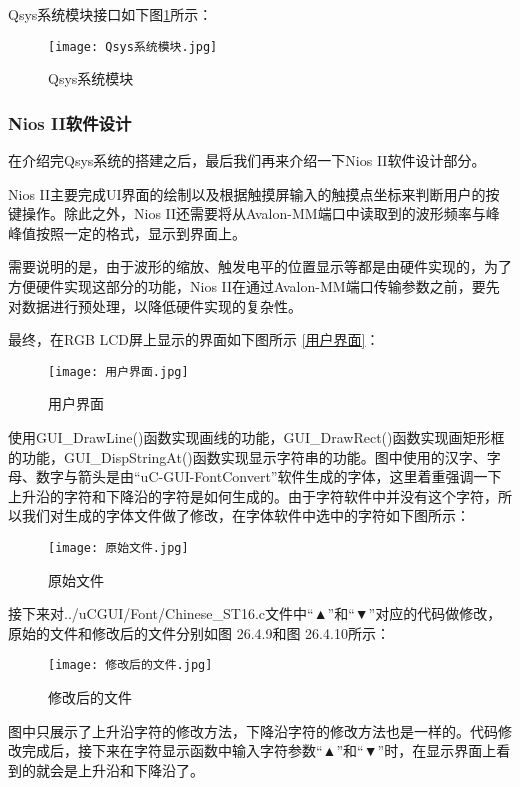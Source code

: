 \documentclass[lang=cn,a4paper,newtx]{elegantpaper}
\begin{document}
Qsys系统模块接口如下图\ref{Qsys系统模块}所示：
  \begin{figure}[!htb]
	\centering
	\caption{Qsys系统模块}
	\label{Qsys系统模块}
	\texttt{[image: Qsys系统模块.jpg]}
\end{figure}

\subsubsection{Nios II软件设计}
在介绍完Qsys系统的搭建之后，最后我们再来介绍一下Nios II软件设计部分。

Nios II主要完成UI界面的绘制以及根据触摸屏输入的触摸点坐标来判断用户的按键操作。除此之外，Nios II还需要将从Avalon-MM端口中读取到的波形频率与峰峰值按照一定的格式，显示到界面上。

需要说明的是，由于波形的缩放、触发电平的位置显示等都是由硬件实现的，为了方便硬件实现这部分的功能，Nios II在通过Avalon-MM端口传输参数之前，要先对数据进行预处理，以降低硬件实现的复杂性。

最终，在RGB LCD屏上显示的界面如下图所示 \ref{用户界面}：
  \begin{figure}[!htb]
	\centering
	\caption{用户界面}
	\label{用户界面1}
	\texttt{[image: 用户界面.jpg]}
\end{figure}

使用GUI\_DrawLine()函数实现画线的功能，GUI\_DrawRect()函数实现画矩形框的功能，GUI\_DispStringAt()函数实现显示字符串的功能。图中使用的汉字、字母、数字与箭头是由“uC-GUI-FontConvert”软件生成的字体，这里着重强调一下上升沿的字符和下降沿的字符是如何生成的。由于字符软件中并没有这个字符，所以我们对生成的字体文件做了修改，在字体软件中选中的字符如下图所示：
  \begin{figure}[!htb]
	\centering
	\caption{原始文件}
	\label{原始文件}
	\texttt{[image: 原始文件.jpg]}
\end{figure}
接下来对../uCGUI/Font/Chinese\_ST16.c文件中“▲”和“▼”对应的代码做修改，原始的文件和修改后的文件分别如图 26.4.9和图 26.4.10所示：
  \begin{figure}[!htb]
	\centering
	\caption{修改后的文件}
	\label{修改后的文件}
	\texttt{[image: 修改后的文件.jpg]}
\end{figure}
图中只展示了上升沿字符的修改方法，下降沿字符的修改方法也是一样的。代码修改完成后，接下来在字符显示函数中输入字符参数“▲”和“▼”时，在显示界面上看到的就会是上升沿和下降沿了。
\end{document}
